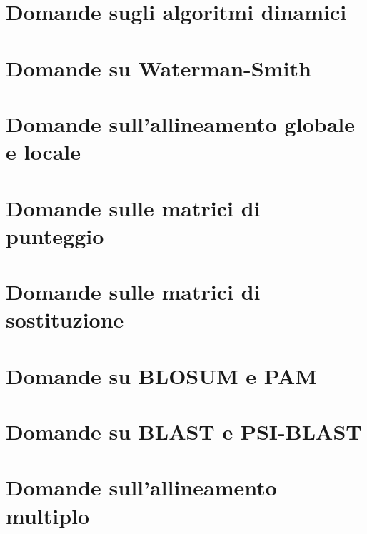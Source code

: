 \documentclass{article}
\begin{document}
\section{Domande sugli algoritmi dinamici}

\section{Domande su Waterman-Smith}

\section{Domande sull'allineamento globale e locale}

\section{Domande sulle matrici di punteggio}

\section{Domande sulle matrici di sostituzione}

\section{Domande su BLOSUM e PAM}

\section{Domande su BLAST e PSI-BLAST}

\section{Domande sull'allineamento multiplo}
\end{document}
